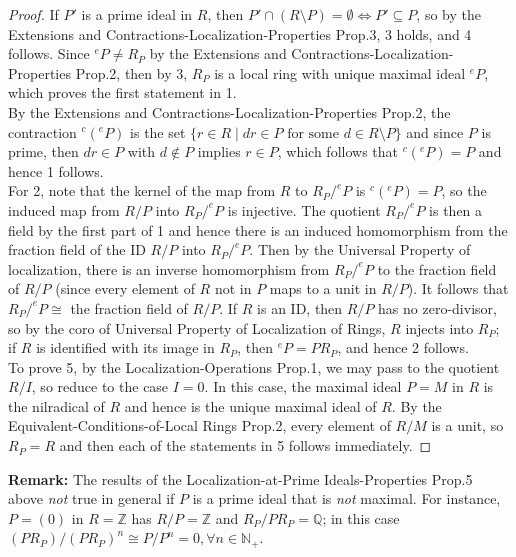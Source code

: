 \begin{proof}
    If $P'$ is a prime ideal in $R$, then $P' \cap (R\setminus P)= \emptyset \Leftrightarrow P'\subseteq P$, so by the Extensions and Contractions-Localization-Properties Prop.3, 3 holds, and 4 follows. Since $^eP \neq R_P$ by the Extensions and Contractions-Localization-Properties Prop.2, then by 3, $R_P$ is a local ring with unique maximal ideal $^eP$, which proves the first statement in 1.\\
    
    By the Extensions and Contractions-Localization-Properties Prop.2, the contraction $^c(^eP)$ is the set $\{ r\in R\mid dr \in P \text{ for some } d\in R\setminus P \}$ and since $P$ is prime, then $dr\in P$ with $d \notin P$ implies $r\in P$, which follows that $^c(^eP)=P$ and hence 1 follows.\\
    
    For 2, note that the kernel of the map from $R$ to $R_P/^eP$ is $^c(^eP)=P$, so the induced map from $R/P$ into $R_P/^eP$ is injective. The quotient $R_P/^eP$ is then a field by the first part of 1 and hence there is an induced homomorphism from the fraction field of the ID $R/P$ into $R_P/^eP$. Then by the Universal Property of localization, there is an inverse homomorphism from $R_P/^eP$ to the fraction field of $R/P$ (since every element of $R$ not in $P$ maps to a unit in $R/P$). It follows that $R_P/^eP \cong$ the fraction field of $R/P$. If $R$ is an ID, then $R/P$ has no zero-divisor, so by the coro of Universal Property of Localization of Rings, $R$ injects into $R_P$; if $R$ is identified with its image in $R_P$, then $^eP=PR_P$, and hence 2 follows.\\
    
    To prove 5, by the Localization-Operations Prop.1, we may pass to the quotient $R/I$, so reduce to the case $I=0$. In this case, the maximal ideal $P=M$ in $R$ is the nilradical of $R$ and hence is the unique maximal ideal of $R$. By the Equivalent-Conditions-of-Local Rings Prop.2, every element of $R/M$ is a unit, so $R_P=R$ and then each of the statements in 5 follows immediately.
\end{proof}

\noindent\textbf{Remark:} The results of the Localization-at-Prime Ideals-Properties Prop.5 above \textit{not} true in general if $P$ is a prime ideal that is \textit{not} maximal. For instance, $P=(0)$ in $R=\mathbb{Z}$ has $R/P= \mathbb{Z}$ and $R_P/PR_P=\mathbb{Q}$; in this case $(PR_P)/(PR_P)^n \cong P/P^n=0, \forall n\in \mathbb{N}_+$.

